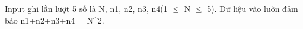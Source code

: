 Input ghi lần lượt 5 số là N, n1, n2, n3, n4(1 $\le$ N $\le$ 5). Dữ liệu vào luôn đảm bảo n1+n2+n3+n4 = N^2.  

\